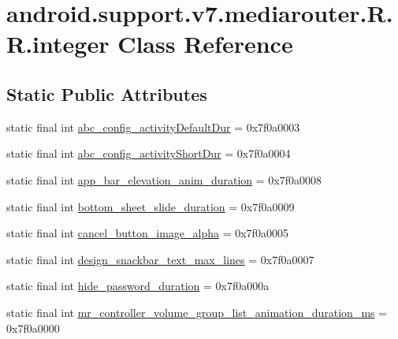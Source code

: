 \hypertarget{classandroid_1_1support_1_1v7_1_1mediarouter_1_1_r_1_1integer}{
\section{android.support.v7.mediarouter.R.R.integer Class Reference}
\label{classandroid_1_1support_1_1v7_1_1mediarouter_1_1_r_1_1integer}
}
\subsection*{Static Public Attributes}
\begin{CompactItemize}
\item 
static final int \hyperlink{classandroid_1_1support_1_1v7_1_1mediarouter_1_1_r_1_1integer_035f6ea1a3ffd4fd35fe106301fd0e62}{abc\_\-config\_\-activityDefaultDur} = 0x7f0a0003
\item 
static final int \hyperlink{classandroid_1_1support_1_1v7_1_1mediarouter_1_1_r_1_1integer_4af7b752242f78e72bedb3266a866024}{abc\_\-config\_\-activityShortDur} = 0x7f0a0004
\item 
static final int \hyperlink{classandroid_1_1support_1_1v7_1_1mediarouter_1_1_r_1_1integer_c0d5b183898e059579254bfae1ad4a98}{app\_\-bar\_\-elevation\_\-anim\_\-duration} = 0x7f0a0008
\item 
static final int \hyperlink{classandroid_1_1support_1_1v7_1_1mediarouter_1_1_r_1_1integer_3324f073a017263e9d301cca06172fa7}{bottom\_\-sheet\_\-slide\_\-duration} = 0x7f0a0009
\item 
static final int \hyperlink{classandroid_1_1support_1_1v7_1_1mediarouter_1_1_r_1_1integer_f56f098bd926fb95aa1d71e000a7365f}{cancel\_\-button\_\-image\_\-alpha} = 0x7f0a0005
\item 
static final int \hyperlink{classandroid_1_1support_1_1v7_1_1mediarouter_1_1_r_1_1integer_531bda6741e3a945e31f3d14f1ec3772}{design\_\-snackbar\_\-text\_\-max\_\-lines} = 0x7f0a0007
\item 
static final int \hyperlink{classandroid_1_1support_1_1v7_1_1mediarouter_1_1_r_1_1integer_41b1397479514c8993a97d5c52332e36}{hide\_\-password\_\-duration} = 0x7f0a000a
\item 
static final int \hyperlink{classandroid_1_1support_1_1v7_1_1mediarouter_1_1_r_1_1integer_c924b8f1c6f75a6016563621fc38a118}{mr\_\-controller\_\-volume\_\-group\_\-list\_\-animation\_\-duration\_\-ms} = 0x7f0a0000
\item 

\end{CompactItemize}
